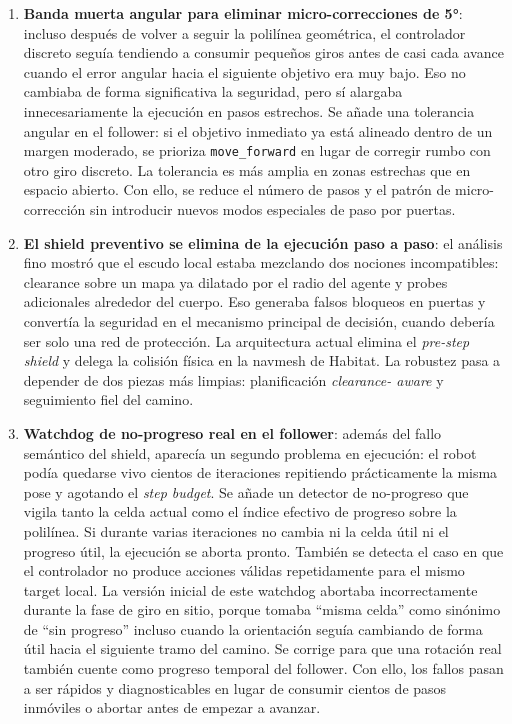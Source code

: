\begin{enumerate}
  \item \textbf{Banda muerta angular para eliminar micro-correcciones de 5°}:
        incluso después de volver a seguir la polilínea geométrica, el
        controlador discreto seguía tendiendo a consumir pequeños giros antes
        de casi cada avance cuando el error angular hacia el siguiente objetivo
        era muy bajo. Eso no cambiaba de forma significativa la seguridad, pero
        sí alargaba innecesariamente la ejecución en pasos estrechos. Se añade
        una tolerancia angular en el follower: si el objetivo inmediato ya está
        alineado dentro de un margen moderado, se prioriza
        \texttt{move\_forward} en lugar de corregir rumbo con otro giro
        discreto. La tolerancia es más amplia en zonas estrechas que en espacio
        abierto. Con ello, se reduce el número de pasos y el patrón de
        micro-corrección sin introducir nuevos modos especiales de paso por
        puertas.

  \item \textbf{El shield preventivo se elimina de la ejecución paso a paso}:
        el análisis fino mostró que el escudo local estaba mezclando dos
        nociones incompatibles: clearance sobre un mapa ya dilatado por el
        radio del agente y probes adicionales alrededor del cuerpo. Eso
        generaba falsos bloqueos en puertas y convertía la seguridad en el
        mecanismo principal de decisión, cuando debería ser solo una red de
        protección. La arquitectura actual elimina el \textit{pre-step shield}
        y delega la colisión física en la navmesh de Habitat. La robustez pasa
        a depender de dos piezas más limpias: planificación \textit{clearance-
        aware} y seguimiento fiel del camino.

  \item \textbf{Watchdog de no-progreso real en el follower}: además del fallo
        semántico del shield, aparecía un segundo problema en ejecución: el
        robot podía quedarse vivo cientos de iteraciones repitiendo
        prácticamente la misma pose y agotando el \textit{step budget}. Se
        añade un detector de no-progreso que vigila tanto la celda actual como
        el índice efectivo de progreso sobre la polilínea. Si durante varias
        iteraciones no cambia ni la celda útil ni el progreso útil, la
        ejecución se aborta pronto. También se detecta el caso en que el
        controlador no produce acciones válidas repetidamente para el mismo
        target local. La versión inicial de este watchdog abortaba
        incorrectamente durante la fase de giro en sitio, porque tomaba
        ``misma celda'' como sinónimo de ``sin progreso'' incluso cuando la
        orientación seguía cambiando de forma útil hacia el siguiente tramo del
        camino. Se corrige para que una rotación real también cuente como
        progreso temporal del follower. Con ello, los fallos pasan a ser
        rápidos y diagnosticables en lugar de consumir cientos de pasos
        inmóviles o abortar antes de empezar a avanzar.


\end{enumerate}
